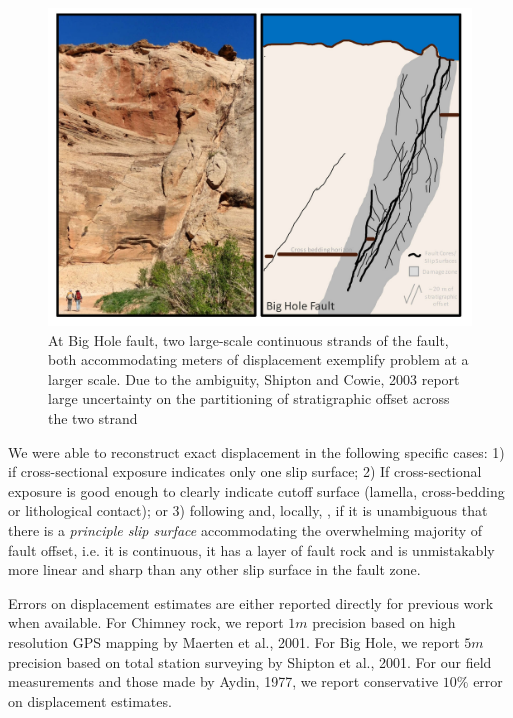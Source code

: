 \documentclass[12pt,a4paper]{article}
\begin{document}
\begin{figure}[h]
	\centering

		\includegraphics[width=\textwidth]{big_hole_cliff}

	\caption{At Big Hole fault, two large-scale continuous strands of the fault, both accommodating meters of displacement exemplify problem at a larger scale. Due to the ambiguity, Shipton and Cowie, 2003 report large uncertainty on the partitioning of stratigraphic offset across the two strand}
	\label{big_hole_cliff}
\end{figure}  

We were able to reconstruct exact displacement in the following specific cases: 1) if cross-sectional exposure indicates only one slip surface; 2) If cross-sectional exposure is good enough to clearly indicate cutoff surface (lamella, cross-bedding or lithological contact); or 3) following \cite{chester1986implications} and, locally, \cite{shipton2001damage}, if it is unambiguous that there is a \textit{principle slip surface} accommodating the overwhelming majority of fault offset, i.e. it is continuous, it has a layer of fault rock and is unmistakably more linear and sharp than any other slip surface in the fault zone. 

Errors on displacement estimates are either reported directly for previous work when available. For Chimney rock, we report $1m$ precision based on high resolution GPS mapping by Maerten et al., 2001. For Big Hole, we report $5m$ precision based on total station surveying by Shipton et al., 2001. For our field measurements and those made by Aydin, 1977, we report conservative $10\%$ error on displacement estimates. 
\end{document}
